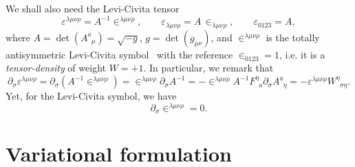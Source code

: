 \documentclass[
10pt, %
a4paper, %
oneside, %
headinclude,footinclude, %
BCOR5mm, %
]{scrartcl}
\newcommand{\IP}[1]{{\color{Red}[IP:\ \ #1]}}
\newcommand{\pd}[1]{\partial_{#1}}
\newcommand{\itetr}[2]{F^{#1}_{\phantom{#1}#2}}
\newcommand{\tetr}[2]{A^{#1}_{\phantom{#1}#2}}
\newcommand{\deth}{A}
\newcommand{\D}[1]{\partial_{#1}} %
\newcommand{\w}[2]{W^{#1}_{\phantom{#1}#2}}
\newcommand{\LCsymb}{\bm{\in}}    %
\newcommand{\LCtens}{\varepsilon} %
\begin{document}
We shall also need the Levi-Civita tensor
\begin{equation}\label{def.LeviCivita}
\LCtens^{\lambda\mu\nu\rho} = \deth^{-1} \LCsymb^{\lambda\mu\nu\rho}, 
\qquad 
\LCtens_{\lambda\mu\nu\rho} = 
\deth \, \LCsymb_{\lambda\mu\nu\rho},
\qquad
\LCtens_{0123} = \deth,
\end{equation}
where $ \deth = \det(\tetr{a}{\mu}) = \sqrt{-g}$, $ g = \det(g_{\mu\nu}) $, and $ 
\LCsymb^{{\lambda\mu\nu\rho}} $ is the totally antisymmetric Levi-Civita 
symbol~\cite{AldrovandiPereiraBook} with the reference $ \LCsymb_{0123} = 1 $, 
i.e. it is a \emph{tensor-density} of weight $ W=+1 $.
In particular, we remark that
\begin{equation}\label{eqn.diff.LeviCivita}
\D{\sigma}\LCtens^{\lambda\mu\nu\rho} = 
\pd{\sigma}(\deth^{-1}\LCsymb^{\lambda\mu\nu\rho}) = 
\LCsymb^{\lambda\mu\nu\rho}\pd{\sigma}\deth^{-1} = 
-\LCsymb^{\lambda\mu\nu\rho}\deth^{-1}\itetr{\eta}{a}\pd{\sigma}\tetr{a}{\eta} = 
-\LCtens^{\lambda\mu\nu\rho}\w{\eta}{\sigma\eta}. 
\end{equation}
Yet, for the Levi-Civita symbol, we have
\begin{equation}\label{eqn.diff.LCsymb}
\D{\sigma}\LCsymb^{\lambda\mu\nu\rho} = 0.
\end{equation}

%


\section{Variational formulation}

\end{document}
